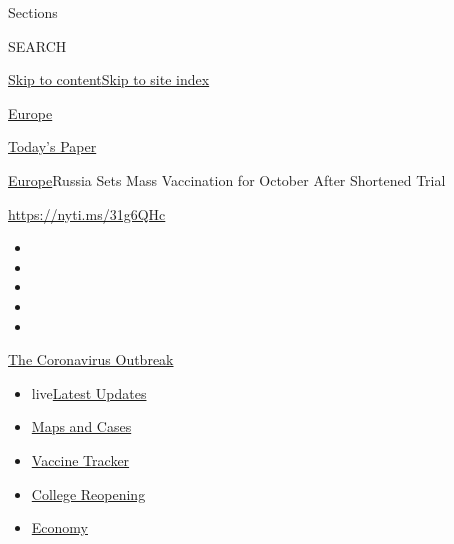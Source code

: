 Sections

SEARCH

\protect\hyperlink{site-content}{Skip to
content}\protect\hyperlink{site-index}{Skip to site index}

\href{https://www.nytimes.com/section/world/europe}{Europe}

\href{https://myaccount.nytimes.com/auth/login?response_type=cookie\&client_id=vi}{}

\href{https://www.nytimes.com/section/todayspaper}{Today's Paper}

\href{/section/world/europe}{Europe}\textbar{}Russia Sets Mass
Vaccination for October After Shortened Trial

\url{https://nyti.ms/31g6QHc}

\begin{itemize}
\item
\item
\item
\item
\item
\end{itemize}

\href{https://www.nytimes.com/news-event/coronavirus?action=click\&pgtype=Article\&state=default\&region=TOP_BANNER\&context=storylines_menu}{The
Coronavirus Outbreak}

\begin{itemize}
\tightlist
\item
  live\href{https://www.nytimes.com/2020/08/03/world/coronavirus-covid-19.html?action=click\&pgtype=Article\&state=default\&region=TOP_BANNER\&context=storylines_menu}{Latest
  Updates}
\item
  \href{https://www.nytimes.com/interactive/2020/us/coronavirus-us-cases.html?action=click\&pgtype=Article\&state=default\&region=TOP_BANNER\&context=storylines_menu}{Maps
  and Cases}
\item
  \href{https://www.nytimes.com/interactive/2020/science/coronavirus-vaccine-tracker.html?action=click\&pgtype=Article\&state=default\&region=TOP_BANNER\&context=storylines_menu}{Vaccine
  Tracker}
\item
  \href{https://www.nytimes.com/2020/08/02/us/covid-college-reopening.html?action=click\&pgtype=Article\&state=default\&region=TOP_BANNER\&context=storylines_menu}{College
  Reopening}
\item
  \href{https://www.nytimes.com/live/2020/08/03/business/stock-market-today-coronavirus?action=click\&pgtype=Article\&state=default\&region=TOP_BANNER\&context=storylines_menu}{Economy}
\end{itemize}

